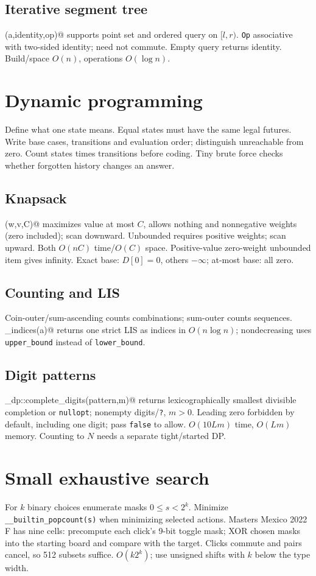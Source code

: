 \subsection{Iterative segment tree}
(a,identity,op)@ supports point set and ordered query on
$[l,r)$. \texttt{Op} associative with two-sided identity; need not commute.
Empty query returns identity. Build/space $O(n)$, operations $O(\log n)$.

\section{Dynamic programming}
Define what one state means. Equal states must have the same legal futures.
Write base cases, transitions and evaluation order; distinguish unreachable
from zero. Count states times transitions before coding. Tiny brute force
checks whether forgotten history changes an answer.
\subsection{Knapsack}
(w,v,C)@ maximizes value at most $C$, allows nothing and
nonnegative weights (zero included); scan downward. Unbounded requires
positive weights; scan upward. Both $O(nC)$ time/$O(C)$ space. Positive-value
zero-weight unbounded item gives infinity. Exact base: $D[0]=0$, others
$-\infty$; at-most base: all zero.

\subsection{Counting and LIS}
Coin-outer/sum-ascending counts combinations; sum-outer counts sequences.
\verb@lis_indices(a)@ returns one strict LIS as indices in $O(n\log n)$;
nondecreasing uses \texttt{upper\_bound} instead of \texttt{lower\_bound}.

\subsection{Digit patterns}
\verb@finals_dp::complete_digits(pattern,m)@ returns lexicographically
smallest divisible completion or \texttt{nullopt}; nonempty digits/\texttt{?},
$m>0$. Leading zero forbidden by default, including one digit; pass
\texttt{false} to allow. $O(10Lm)$ time, $O(Lm)$ memory. Counting to $N$ needs
a separate tight/started DP.

\section{Small exhaustive search}
For $k$ binary choices enumerate masks $0\le s<2^k$. Minimize
\texttt{\_\_builtin\_popcount(s)} when minimizing selected actions.
Masters Mexico 2022 F has nine cells: precompute each click's 9-bit toggle
mask; XOR chosen masks into the starting board and compare with the target.
Clicks commute and pairs cancel, so 512 subsets suffice. $O(k2^k)$;
use unsigned shifts with $k$ below the type width.


